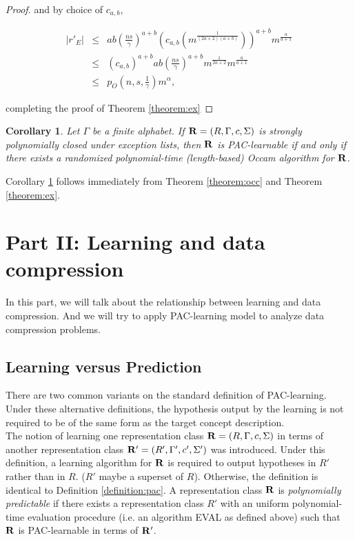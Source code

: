 \documentclass[12pt]{article}
\newtheorem{corollary}[theorem]{Corollary}
\begin{document}
\begin{proof}
and by choice of $c_{a,b}$,

\begin{eqnarray*}
|r'_E|
&\le& ab (\frac{ns}{\gamma})^{a+b} (c_{a,b} (m^{\frac {1}{(2a+2)(a+b)}}))^{a+b} m^{\frac {a}{a+1}} \\
&\le& (c_{a,b})^{a+b} ab (\frac{ns}{\gamma})^{a+b} m^{\frac {1}{2a+2}}  m^{\frac {a}{a+1}} \\
&\le& p_O(n, s, \frac {1}{\gamma})m^{\alpha},
\end{eqnarray*}

completing the proof of Theorem \ref{theorem:ex}
\end{proof}

\begin{corollary} \label {corollary:ex}
Let $\Gamma$ be a finite alphabet. If ${\bf R} = (R, \Gamma, c, \Sigma)$ is strongly polynomially closed under exception lists, then ${\bf R}$ is PAC-learnable if and only if there exists a randomized polynomial-time (length-based) Occam algorithm for ${\bf R}$.
\end{corollary}

Corollary \ref{corollary:ex} follows immediately from Theorem \ref{theorem:occ} and Theorem \ref{theorem:ex}.

\section{Part II: Learning and data compression}


In this part, we will talk about the relationship between learning and data compression. And we will try to apply PAC-learning model to analyze data compression problems.

\subsection{Learning versus Prediction}

There are two common variants on the standard definition of PAC-learning. Under these alternative definitions, the hypothesis output by the learning is not required to be of the same form as the target concept description. \\

The notion of learning one representation class ${\bf R} = (R, \Gamma, c, \Sigma)$ in terms of another representation class ${\bf R'} = (R', \Gamma', c', \Sigma')$ was introduced. Under this definition, a learning algorithm for ${\bf R}$ is required to output hypotheses in $R'$ rather than in $R$. ($R'$ maybe a superset of $R$). Otherwise, the definition is identical to Definition \ref {definition:pac}. A representation class ${\bf R}$ is \emph {polynomially predictable} if there exists a representation class $R'$ with an uniform polynomial-time evaluation procedure (i.e. an algorithm EVAL as defined above) such that ${\bf R}$ is PAC-learnable in terms of ${\bf R'}$. \\
\end{document}
